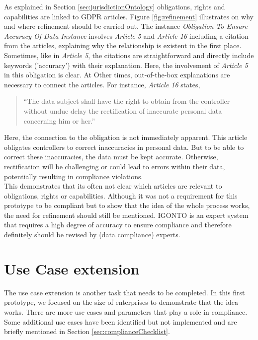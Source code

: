 \documentclass[
  a4paper,  %
  twoside,  %
  bibliography=totoc,
  headsepline,
  cleardoublepage=empty,
  parskip=half,
  draft=false
]{scrbook}
\begin{document}
As explained in Section \ref{sec:jurisdictionOntology} obligations, rights and capabilities are linked to GDPR articles. Figure \ref{fig:refinement} illustrates on why and where refinement should be carried out. The instance \textit{Obligation To Ensure Accuracy Of Data Instance} involves \textit{Article 5} and \textit{Article 16} including a citation from the articles, explaining why the relationship is existent in the first place. Sometimes, like in \textit{Article 5}, the citations are straightforward and directly include keywords ('accuracy') with their explanation. Here, the involvement of \textit{Article 5} in this obligation is clear. At Other times, out-of-the-box explanations are necessary to connect the articles. For instance, \textit{Article 16} states,  \begin{quote}
``The data subject shall have the right to obtain from the controller without undue delay the rectification of inaccurate personal data concerning him or her.''
\end{quote}
Here, the connection to the obligation is not immediately apparent. This article obligates controllers to correct inaccuracies in personal data. But to be able to correct these inaccuracies, the data must be kept accurate. Otherwise, rectification will be challenging or could lead to errors within their data, potentially resulting in compliance violations. \\
This demonstrates that its often not clear which articles are relevant to obligations, rights or capabilities. Although it was not a requirement for this prototype to be compliant but to show that the idea of the whole process works, the need for refinement should still be mentioned. IGONTO is an expert system that requires a high degree of accuracy to ensure compliance and therefore definitely should be revised by (data compliance) experts. \\   

\section{Use Case extension}\label{sec:Use case extension}
The use case extension is another task that needs to be completed. In this first prototype, we focused on the size of enterprises to demonstrate that the idea works. There are more use cases and parameters that play a role in compliance. Some additional use cases have been identified but not implemented and are briefly mentioned in Section \ref{sec:complianceChecklist}.\\
\end{document}
